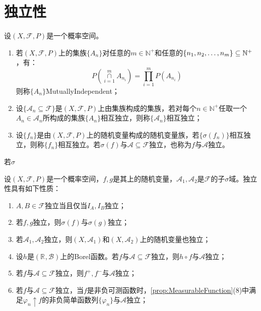 \section{独立性}
\begin{definition}
	设$(X,\mathscr{F},P)$是一个概率空间。
	\begin{enumerate}
		\item 若$(X,\mathscr{F},P)$上的集族$\{A_n\}$对任意的$m\in\mathbb{N}^+$和任意的$\{n_1, n_2, \dots, n_{m}\}\subseteq\mathbb{N}^+$，有：
		\begin{equation*}
			P\left(\underset{i=1}{\overset{m}{\cap}}A_{n_i}\right)=\prod_{i=1}^{m}P(A_{n_i})
		\end{equation*}
		则称$\{A_n\}$\gls{MutuallyIndependent}；
		\item 设$\{\mathscr{A}_n\subseteq\mathscr{F}\}$是$(X,\mathscr{F},P)$上由集族构成的集族，若对每个$n\in\mathbb{N}^+$任取一个$A_n\in\mathscr{A}_n$所构成的集族$\{A_n\}$相互独立，则称$\{\mathscr{A}_n\}$相互独立；
		\item 设$\{f_n\}$是由$(X,\mathscr{F},P)$上的随机变量构成的随机变量族，若$\{\sigma(f_n)\}$相互独立，则称$\{f_n\}$相互独立。若$\sigma(f)$与$\mathscr{A}\subseteq\mathscr{F}$独立，也称为$f$与$\mathscr{A}$独立。
	\end{enumerate}
	若$\sigma	$
\end{definition}
\begin{property}\label{prop:Independent}
	设$(X,\mathscr{F},P)$是一个概率空间，$f,g$是其上的随机变量，$\mathscr{A}_1,\mathscr{A}_2$是$\mathscr{F}$的子$\sigma$域。独立性具有如下性质：
	\begin{enumerate}
		\item $A,B\in\mathscr{F}$独立当且仅当$I_A,I_B$独立；
		\item 若$f,g$独立，则$\sigma(f)$与$\sigma(g)$独立；
		\item 若$\mathscr{A}_1,\mathscr{A}_2$独立，则$(X,\mathscr{A}_1)$和$(X,\mathscr{A}_2)$上的随机变量也独立；
		\item 设$h$是$(\mathbb{R}^{},\mathcal{B})$上的Borel函数。若$f$与$\mathscr{A}\subseteq\mathscr{F}$独立，则$h\circ f$与$\mathscr{A}$独立；
		\item 若$f$与$\mathscr{A}\subseteq\mathscr{F}$独立，则$f^+,f^-$与$\mathscr{A}$独立；
		\item 若$f$与$\mathscr{A}\subseteq\mathscr{F}$独立，当$f$是非负可测函数时，\cref{prop:MeasurableFunction}(8)中满足$\varphi_n\uparrow f$的非负简单函数列$\{\varphi_n\}$与$\mathscr{A}$独立；
	\end{enumerate}
\end{property}
